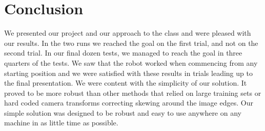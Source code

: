 \section{Conclusion}
\label{section::conclusion}

We presented our project and our approach to the class and were pleased with our results. In the two runs we reached the goal on the first trial, and not on the second trial. In our final dozen tests, we managed to reach the goal in three quarters of the tests. We saw that the robot worked when commencing from any starting position and we were satisfied with these results in trials leading up to the final presentation. We were content with the simplicity of our solution. It proved to be more robust than other methods that relied on large training sets or hard coded camera transforms correcting skewing around the image edges. Our simple solution was designed to be robust and easy to use anywhere on any machine in as little time as possible. 

